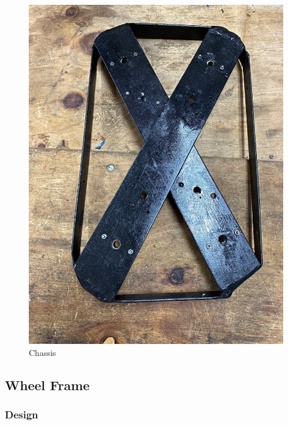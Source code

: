 \begin{figure}[H]
    \centering
    \includegraphics[scale = 0.10]{Figures/chassisFABRICATED.jpg}
    \caption{Chassis}
    \label{fig:chassisFAB}
\end{figure}

\subsection{Wheel Frame}
\subsubsection{Design}
\label{sec:wheelDesign}

